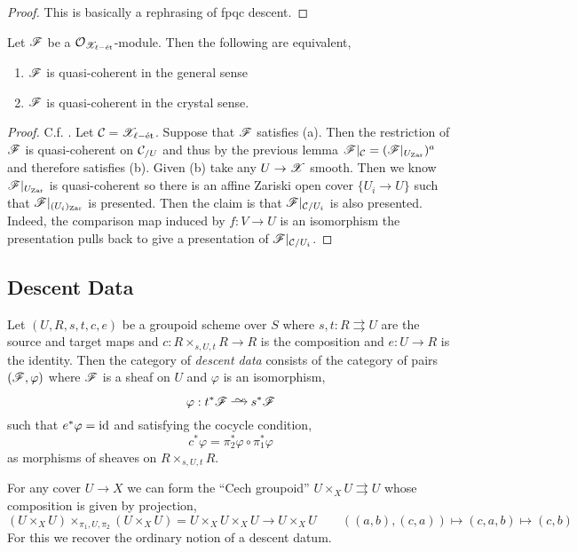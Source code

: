 \documentclass[12pt]{article}
\begin{document}
\begin{proof}
This is basically a rephrasing of fpqc descent.
\end{proof}

\begin{prop}
Let $\mathscr{F}$ be a $\mathcal{O}_{\mathscr{X}_{\ell-\text{\'{e}t}}}$-module. Then the following are equivalent,
\begin{enumerate}
\item $\mathscr{F}$ is quasi-coherent in the general sense
\item $\mathscr{F}$ is quasi-coherent in the crystal sense.
\end{enumerate}
\end{prop}

\begin{proof}
C.f. . Let $\mathcal{C} = \mathscr{X}_{\ell-\text{\'{e}t}}$. Suppose that $\mathscr{F}$ satisfies (a). Then the restriction of $\mathscr{F}$ is quasi-coherent on $\mathcal{C}_{/U}$ and thus by the previous lemma $\mathscr{F}|_{\mathcal{C}} = (\mathscr{F}|_{U_{\mathrm{Zar}}})^a$ and therefore satisfies (b). Given (b) take any $U \to \mathscr{X}$ smooth. Then we know $\mathscr{F}|_{U_{\mathrm{Zar}}}$ is quasi-coherent so there is an affine Zariski open cover $\{ U_i \to U \}$ such that $\mathscr{F}|_{(U_i)_{\mathrm{Zar}}}$ is presented. Then the claim is that $\mathscr{F}|_{\mathcal{C}/U_i}$ is also presented. Indeed, the comparison map induced by $f : V \to U$ is an isomorphism the presentation pulls back to give a presentation of $\mathscr{F}|_{\mathcal{C}/U_i}$. 
\end{proof}

\subsection{Descent Data}

\begin{defn}
Let $(U,R,s,t,c, e)$ be a groupoid scheme over $S$ where $s,t : R \rightrightarrows U$ are the source and target maps and $c : R \times_{s,U,t} R \to R$ is the composition and $e : U \to R$ is the identity. Then the category of \textit{descent data} consists of the category of pairs $(\mathscr{F}, \varphi)$ where $\mathscr{F}$ is a sheaf on $U$ and $\varphi$ is an isomorphism,
\[ \varphi : t^* \F \iso s^* \F \]
such that $e^* \varphi = \mathrm{id}$ and satisfying the cocycle condition,
\[ c^* \varphi = \pi_2^* \varphi \circ \pi_1^* \varphi \]
as morphisms of sheaves on $R \times_{s,U,t} R$. 
\end{defn}

\begin{example}
For any cover $U \to X$ we can form the ``Cech groupoid'' $U \times_X U \rightrightarrows U$ whose composition is given by projection,
\[ (U \times_X U) \times_{\pi_1, U, \pi_2} (U \times_X U) = U \times_X U \times_X U \to U \times_X U \quad \quad ((a,b), (c,a)) \mapsto (c,a,b) \mapsto (c, b) \] 
For this we recover the ordinary notion of a descent datum. 
\end{example}
\end{document}
